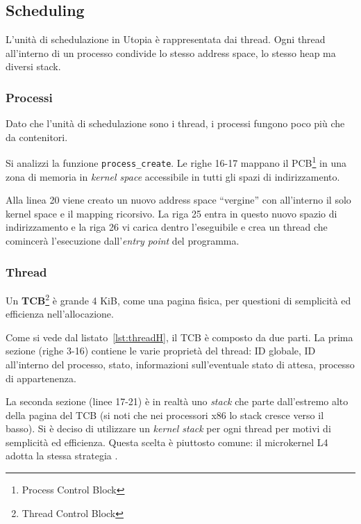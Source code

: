 \documentclass[12pt,a4paper]{report}
\newcommand{\vir}[1]{``#1''}
\begin{document}
		\subsection{Scheduling}
			L'unità di schedulazione in Utopia è rappresentata dai thread. Ogni thread all'interno di un processo
			condivide lo stesso address space, lo stesso heap ma diversi stack.
		
			\subsubsection{Processi}
				Dato che l'unità di schedulazione sono i thread, i processi fungono poco più che da contenitori.
								
				
			
				Si analizzi la funzione \texttt{process\_create}. Le righe 16-17 mappano il PCB\footnote{Process Control Block}
				in una zona di memoria in \emph{kernel space} accessibile in tutti gli spazi di indirizzamento.
			
				Alla linea 20 viene creato un nuovo address space \vir{vergine} con all'interno il solo kernel space e
				il mapping ricorsivo. La riga 25 entra in questo nuovo spazio di indirizzamento e la riga 26 vi carica
				dentro l'eseguibile e crea un thread che comincerà l'esecuzione dall'\emph{entry point} del programma.
				
			\subsubsection{Thread}
				Un \textbf{TCB}\footnote{Thread Control Block} è grande 4 KiB, come una pagina fisica, per questioni di semplicità ed efficienza
				nell'allocazione.
			
				
				
				Come si vede dal listato~\ref{lst:threadH}, il TCB è composto da due parti. La prima sezione (righe 3-16)
				contiene le varie proprietà del thread: ID globale, ID all'interno del processo, stato, informazioni sull'eventuale
				stato di attesa, processo di appartenenza.
				
				La seconda sezione (linee 17-21) è in realtà uno \emph{stack} che parte dall'estremo alto della pagina
				del TCB (si noti che nei processori x86 lo stack cresce verso il basso).
				Si è deciso di utilizzare un \emph{kernel stack} per ogni thread per motivi di semplicità ed efficienza.
				Questa scelta è piuttosto comune: il microkernel L4 adotta la stessa strategia \cite{Neider}.
				
\end{document}

